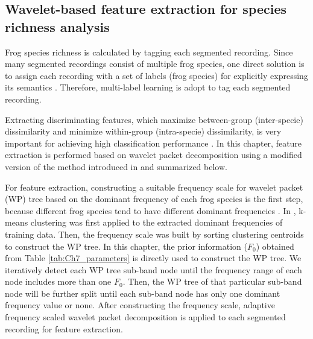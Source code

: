 \subsection{Wavelet-based feature extraction for species richness analysis}
Frog species richness is calculated by tagging each segmented recording. Since many segmented recordings consist of multiple frog species, one direct solution is to assign each recording with a set of labels (frog species) for explicitly expressing its semantics \cite{ZhangReview2014}. Therefore, multi-label learning is adopt to tag each segmented recording. 

Extracting discriminating
features, which maximize between-group (inter-specie) dissimilarity
and minimize within-group (intra-specie) dissimilarity, is very important for achieving high classification performance \cite{huang2009frog, bedoya2014automatic}. In this chapter, feature extraction is performed based on wavelet packet decomposition using a modified version of the method introduced in \cite{Xie2016} and summarized below. 

For feature extraction, constructing a suitable frequency scale for wavelet packet (WP) tree based on the dominant frequency of each frog species is the first step, because different frog species tend to have different dominant frequencies \cite{Gingras2013}. In \cite{Xie2016}, k-means clustering was first applied to the extracted dominant frequencies of training data. Then, the frequency scale was built by sorting clustering centroids to construct the WP tree. In this chapter, the prior information ($F_{0}$) obtained from Table \ref{tab:Ch7_parameters} is directly used to construct the WP tree. We iteratively detect each WP tree sub-band node until the frequency range of each node includes more than one $F_{0}$. Then, the WP tree of that particular sub-band node will be further split until each sub-band node has only one dominant frequency value or none. After constructing the frequency scale, adaptive frequency scaled wavelet packet decomposition is applied to each segmented recording for feature extraction. 


